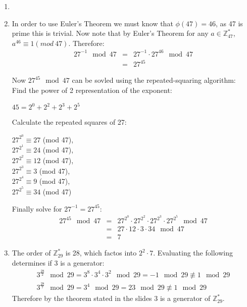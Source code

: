 \begin{enumerate}
    \item

    \item In order to use Euler's Theorem we must know that $\phi(47) = 46$, as 
    47 is prime this is trivial. Now note that by Euler's Theorem for any $a \in
     \mathbb{Z}^{*}_{47}$,\\ $a^{46} \equiv 1 (mod\ 47)$. Therefore:
    \begin{eqnarray*}
        27^{-1} \mod 47 &=& 27^{-1} \cdot 27^{46} \mod 47 \\
        &=& 27^{45}
    \end{eqnarray*}

    Now $27^{45} \mod 47$ can be sovled using the repeated-squaring algorithm: \\
    Find the power of 2 representation of the exponent:
    \begin{center}
        $45 = 2^{0} + 2^{2} + 2^{3} + 2^{5}$
    \end{center}

    Calculate the repeated squares of 27:
    \begin{center}
        $27^{2^{0}} \equiv 27$ (mod 47), \\
        $27^{2^{1}} \equiv 24$ (mod 47), \\
        $27^{2^{2}} \equiv 12$ (mod 47), \\
        $27^{2^{3}} \equiv 3$ (mod 47), \\
        $27^{2^{4}} \equiv 9$ (mod 47), \\
        $27^{2^{5}} \equiv 34$ (mod 47)
    \end{center}

    Finally solve for $27^{-1} = 27^{45}$:
    \begin{eqnarray*}
        27^{45} \mod 47 &=& 27^{2^{0}} \cdot 27^{2^{2}} \cdot 27^{2^{3}} \cdot 27^{2^{5}} \mod 47 \\
        &=& 27 \cdot 12 \cdot 3 \cdot 34 \mod 47 \\
        &=& 7
    \end{eqnarray*}

    \item The order of $\mathbb{Z}^{*}_{29}$ is 28, which factos into $2^{2} \cdot 7$. Evaluating the following determines if 3 is a generator:
    \begin{eqnarray*}
        3^{\frac{28}{2}} \mod 29 = 3^{8} \cdot 3^{4} \cdot 3^{2} \mod 29 = -1 \mod 29 \not\equiv 1 \mod 29 \\
        3^{\frac{28}{7}} \mod 29 = 3^{4} \mod 29 = 23 \mod 29 \not\equiv 1 \mod 29
    \end{eqnarray*}
    Therefore by the theorem stated in the slides\cite{Slides_70} 3 is a generator of $\mathbb{Z}^{*}_{29}$.

\end{enumerate}